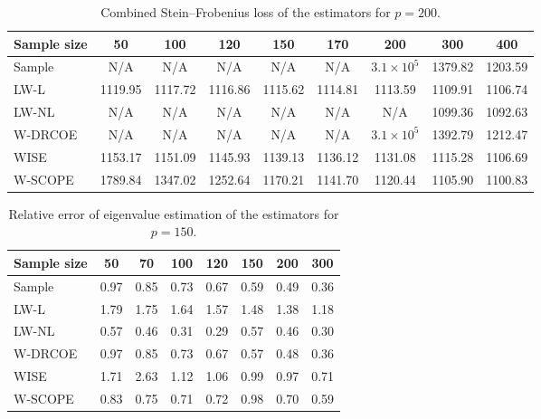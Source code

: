 \documentclass[11pt]{article}
\begin{document}
\begin{table}[H]
\begin{adjustbox}{center}
\begin{tabular}{lcccccccc}
\hline
Sample size & 50 & 100 & 120 & 150 & 170 & 200 & 300 & 400 \\
\hline
Sample     & N/A & N/A & N/A & N/A & N/A & $3.1\times 10^5$ & 1379.82 & 1203.59 \\
LW-L     & 1119.95 & 1117.72 & 1116.86 & 1115.62 & 1114.81 & 1113.59 & 1109.91 & 1106.74 \\
LW-NL    & N/A & N/A & N/A & N/A & N/A & N/A & 1099.36 & 1092.63 \\
W-DRCOE  & N/A & N/A & N/A & N/A & N/A & $3.1\times 10^5$ & 1392.79 & 1212.47 \\
WISE     & 1153.17 & 1151.09 & 1145.93 & 1139.13 & 1136.12 & 1131.08 & 1115.28 & 1106.69 \\
W-SCOPE     & 1789.84 & 1347.02 & 1252.64 & 1170.21 & 1141.70 & 1120.44 & 1105.90 & 1100.83 \\
\hline
\end{tabular}
\end{adjustbox}
\caption{Combined Stein–Frobenius loss of the estimators for $p=200$. }
\label{tab:Frob-p=200}
\end{table}


\begin{table}[H]
\begin{adjustbox}{center}
\begin{tabular}{lccccccc}
\hline
Sample size & 50 & 70 & 100 & 120 & 150 & 200 & 300 \\
\hline
Sample     & 0.97 & 0.85 & 0.73 & 0.67 & 0.59 & 0.49 & 0.36 \\
LW-L     & 1.79 & 1.75 & 1.64 & 1.57 & 1.48 & 1.38 & 1.18 \\
LW-NL    & 0.57 & 0.46 & 0.31 & 0.29 & 0.57 & 0.46 & 0.30 \\
W-DRCOE  & 0.97 & 0.85 & 0.73 & 0.67 & 0.57 & 0.48 & 0.36 \\
WISE     & 1.71 & 2.63 & 1.12 & 1.06 & 0.99 & 0.97 & 0.71 \\
W-SCOPE     & 0.83 & 0.75 & 0.71 & 0.72 & 0.98 & 0.70 & 0.59 \\
\hline
\end{tabular}
\end{adjustbox}
\caption{Relative error of eigenvalue estimation of the estimators for $p=150$. }
\label{tab:EigErr-p=150}
\end{table}
\end{document}
